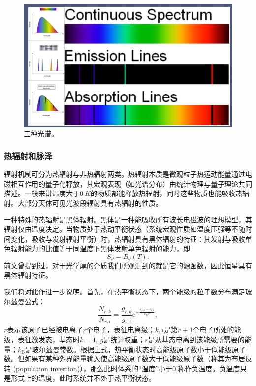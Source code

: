\documentclass[../天体物理基础.tex]{subfiles}
\begin{document}
\begin{figure}[!htbp]
\centering
\includegraphics[width=12cm]{figures/figure1_4.png}
\captionsetup{justification=raggedright, singlelinecheck=false}
\caption{三种光谱。}
\label{三种光谱。}
\end{figure}

\subsubsection{热辐射和脉泽}
辐射机制可分为热辐射与非热辐射两类。热辐射本质是微观粒子热运动能量通过电磁相互作用的量子化释放，其宏观表现（如光谱分布）由统计物理与量子理论共同描述。一般来讲温度大于$\qty{0}{K}$的物质都能释放热辐射，同时这些物质也能吸收热辐射。大部分天体可见光波段辐射具有热辐射的性质。

一种特殊的热辐射是黑体辐射。黑体是一种能吸收所有波长电磁波的理想模型，其辐射仅由温度决定。当物质处于热动平衡状态（系统宏观性质如温度压强等不随时间变化，吸收与发射辐射平衡）时，热辐射具有黑体辐射的特征：其发射与吸收单色辐射能力的比值等于同温度下黑体发射单色辐射的能力，即
\begin{equation}
S_{\nu}=B_{\nu}\left(T\right).
\end{equation}
前文曾提到过，对于光学厚的介质我们所观测到的就是它的源函数，因此恒星具有黑体辐射特征。

我们将对此作进一步说明。首先，在热平衡状态下，两个能级的粒子数分布满足玻尔兹曼公式：
\begin{equation}
\frac{N_{r,k}}{N_{r,i}}=\frac{g_{r,k}}{g_{r,i}}\mathrm{e}^{-\frac{\varepsilon_{r,k}-\varepsilon_{r,i}}{k_{\text{B}}T}},\label{1.2.2}
\end{equation}
$r$表示该原子已经被电离了$r$个电子，表征电离级；$k,i$是第$r+1$个电子所处的能级，表征激发态，基态时$k=1$, $g$是统计权重；$\varepsilon$是从基态电离到该能级所需要的能量；$k_{\text{B}}$是玻尔兹曼常数。根据上式，热平衡状态时高能级原子数小于低能级原子数。但如果有某种外界能量输入使高能级原子数大于低能级原子数（称其为布居反转 (population invertion)），那么此时体系的“温度”小于$0$,称作负温度。负温度只是形式上的温度，此时系统并不处于热平衡状态。
\end{document}
